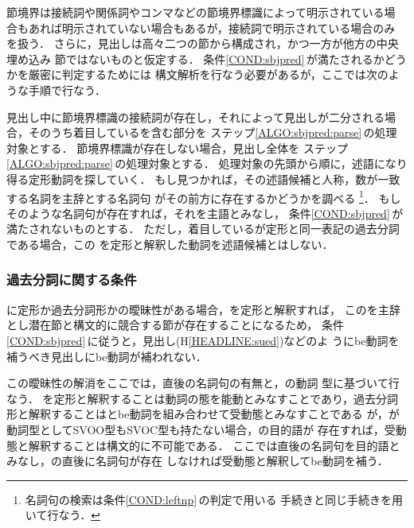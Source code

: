 節境界は接続詞や関係詞やコンマなどの節境界標識によって明示されている場
合もあれば明示されていない場合もあるが，接続詞で明示されている場合のみ
を扱う．
さらに，見出しは高々二つの節から構成され，かつ一方が他方の中央埋め込み
節ではないものと仮定する．
条件\ref{COND:sbjpred}\,が満たされるかどうかを厳密に判定するためには
構文解析を行なう必要があるが，ここでは次のような手順で行なう．
\setcounter{algocounter}{0}
\begin{ALGO}
\step
見出し中に節境界標識の接続詞が存在し，それによって見出しが二分される場
合，そのうち着目している\KEYC を含む部分を
ステップ\ref{ALGO:sbjpred:parse}\,の処理対象とする． 
節境界標識が存在しない場合，見出し全体を
ステップ\ref{ALGO:sbjpred:parse}\,の処理対象とする．
\step
処理対象の先頭から順に，述語になり得る定形動詞を探していく．
もし見つかれば，その述語候補と人称，数が一致する名詞を主辞とする名詞句
がその前方に存在するかどうかを調べる
\footnote{名詞句の検索は条件\ref{COND:leftnp}\,の判定で用いる
手続きと同じ手続きを用いて行なう．}．
もしそのような名詞句が存在すれば，それを主語とみなし，
条件\ref{COND:sbjpred}\,が満たされないものとする．
ただし，着目している\KEYC が定形と同一表記の過去分詞である場合，この
\KEYC を定形と解釈した動詞を述語候補とはしない．
\label{ALGO:sbjpred:parse}
\end{ALGO}

\subsubsection{過去分詞に関する条件}

\KEYC に定形か過去分詞形かの曖昧性がある場合，\KEYC を定形と解釈すれば，
この\KEYC を主辞とし潜在節と構文的に競合する節が存在することになるため，
条件\ref{COND:sbjpred}\,に従うと，見出し(H\ref{HEADLINE:sued})などのよ
うにbe動詞を補うべき見出しにbe動詞が補われない．

この曖昧性の解消をここでは，\KEYC 直後の名詞句の有無と，\KEYC の動詞
型\cite{Hornby77}に基づいて行なう．
\KEYC を定形と解釈することは動詞の態を能動とみなすことであり，過去分詞
形と解釈することは\KEYC とbe動詞を組み合わせて受動態とみなすことである
が，\KEYC が動詞型としてSVOO型もSVOC型も持たない場合，\KEYC の目的語が
存在すれば，受動態と解釈することは構文的に不可能である．
ここでは\KEYC 直後の名詞句を目的語とみなし，\KEYC の直後に名詞句が存在
しなければ受動態と解釈してbe動詞を補う．

